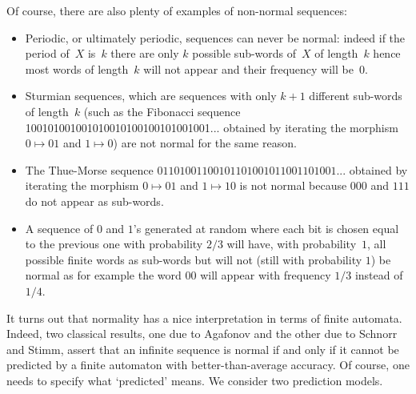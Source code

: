 \documentclass[11pt]{article}
\begin{document}
Of course, there are also plenty of examples of non-normal sequences: \\
\begin{itemize}
\item Periodic, or ultimately periodic, sequences can never be normal: indeed if the period of~$X$ is~$k$ there are only $k$ possible sub-words of~$X$ of length~$k$ hence most words of length~$k$ will not appear and their frequency will be~$0$. 
\item Sturmian sequences, which are sequences with only $k+1$ different sub-words of length~$k$ (such as the Fibonacci sequence 100101001001010010100100101001001... obtained by iterating the morphism $0 \mapsto 01$ and $1 \mapsto 0$) are not normal for the same reason. 
\item The Thue-Morse sequence $01101001100101101001011001101001...$ obtained by iterating the morphism $0 \mapsto 01$ and $1 \mapsto 10$ is not normal because $000$ and $111$ do not appear as sub-words. 
\item A sequence of $0$ and $1$'s generated at random where each bit is chosen equal to the previous one with probability $2/3$ will have, with probability~$1$, all possible finite words as sub-words but will not (still with probability $1$) be normal as for example the word $00$ will appear with frequency $1/3$ instead of $1/4$. 
\end{itemize}



It turns out that normality has a nice interpretation in terms of finite automata. Indeed, two classical results, one due to Agafonov and the other due to Schnorr and Stimm, assert that an infinite sequence is normal if and only if it cannot be predicted by a finite automaton with better-than-average accuracy. Of course, one needs to specify what `predicted' means. We consider two prediction models. 
\end{document}
